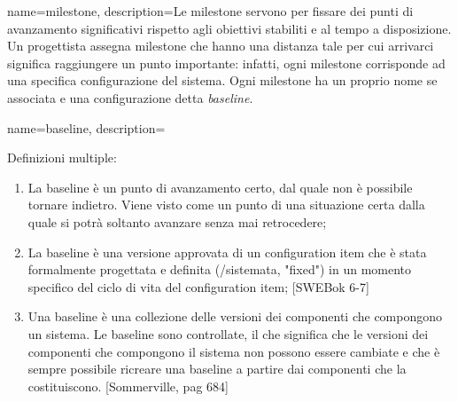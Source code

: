 {
name=milestone,
description={Le milestone servono per fissare dei punti di avanzamento significativi rispetto agli obiettivi stabiliti e al tempo a disposizione.
Un progettista assegna milestone che hanno una distanza tale per cui arrivarci significa raggiungere un punto importante: infatti, ogni milestone corrisponde ad una specifica configurazione del sistema.
Ogni milestone ha un proprio nome se associata e una configurazione detta \textit{baseline}.}
}

{
name=baseline,
description={Definizioni multiple:
\begin{enumerate}
\item La baseline \`e un punto di avanzamento certo, dal quale non è possibile tornare indietro. Viene visto come un punto di una situazione certa dalla quale si potr\`a soltanto avanzare senza mai retrocedere;
\item La baseline \`e una versione approvata di un configuration item che \`e stata formalmente progettata e definita (/sistemata, "fixed") in un momento specifico del ciclo di vita del configuration item; [SWEBok 6-7]
\item Una baseline \`e una collezione delle versioni dei componenti che compongono un sistema. Le baseline sono controllate, il che significa che le versioni dei componenti che compongono il sistema non possono essere cambiate e che \`e sempre possibile ricreare una baseline a partire dai componenti che la costituiscono. [Sommerville, pag 684]
\end{enumerate}
}
}



